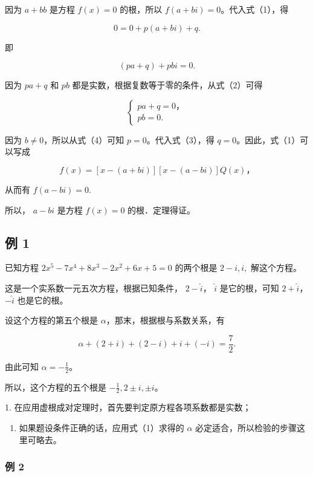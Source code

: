 因为 \(a + bb\) 是方程 \(f(x) = 0\) 的根，所以
\(f(a + bi) = 0\)。代入式（1），得

\[
0 = 0 + p (a + b i) + q.
\]

即

\[
(p a + q) + p b i = 0. \tag {2}
\]

因为 \(pa + q\) 和 \(pb\) 都是实数，根据复数等于零的条件，从式（2）可得

\[
\left\{ \begin{array}{c} p a + q = 0\text{，} \\ p b = 0. \end{array} \right. \tag {3}
\]

因为 \(b \neq 0\)，所以从式（4）可知 \(p = 0\)。代入式（3），得
\(q = 0\)。因此，式（1）可以写成

\[
f (x) = [ x - (a + b i) ] [ x - (a - b i) ] Q (x)\text{，} \tag {5}
\]

从而有 \(f(a - bi) = 0.\)

所以， \(a - bi\) 是方程 \(f(x) = 0\) 的根．定理得证。

\subsection{例 1}

已知方程 \(2x^{5} - 7x^{4} + 8x^{3} - 2x^{2} + 6x + 5 = 0\) 的两个根是
\(2 - i, i,\) 解这个方程。

 这是一个实系数一元五次方程，根据已知条件，
\(2-\hat{i}\)， \(\hat{i}\) 是它的根，可知 \(2+\hat{i}\)， \(-\hat{i}\)
也是它的根。

设这个方程的第五个根是 \(\alpha\)，那末，根据根与系数关系，有

\[
\alpha + (2 + i) + (2 - i) + i + (- i) = \frac {7}{2}. \tag {1}
\]

由此可知 \(\alpha = -\frac{1}{2}\)。

所以，这个方程的五个根是 \(-\frac{1}{2}, 2 \pm i, \pm i\)。

 1.
在应用虚根成对定理时，首先要判定原方程各项系数都是实数；

\begin{enumerate}[start=2]
\item
  如果题设条件正确的话，应用式（1）求得的 \(\alpha\)
  必定适合，所以检验的步骤这里可略去。
\end{enumerate}

\subsubsection{例 2}

